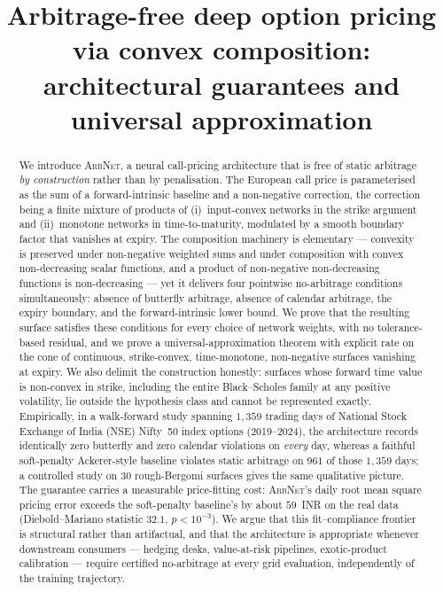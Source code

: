 \documentclass[largeformat]{interact}
\theoremstyle{plain}
\theoremstyle{definition}
\newcommand{\arbnet}{\textsc{ArbNet}}
\newcommand{\bs}{Black--Scholes}
\begin{document}

\title{Arbitrage-free deep option pricing via convex composition:
architectural guarantees and universal approximation}

\author{
}

\maketitle

\begin{abstract}
We introduce \arbnet{}, a neural call-pricing architecture that is free of
static arbitrage \emph{by construction} rather than by penalisation. The
European call price is parameterised as the sum of a forward-intrinsic baseline
and a non-negative correction, the correction being a finite mixture of
products of (i)~input-convex networks in the strike argument and (ii)~monotone
networks in time-to-maturity, modulated by a smooth boundary factor that
vanishes at expiry. The composition machinery is elementary --- convexity is
preserved under non-negative weighted sums and under composition with convex
non-decreasing scalar functions, and a product of non-negative non-decreasing
functions is non-decreasing --- yet it delivers four pointwise no-arbitrage
conditions simultaneously: absence of butterfly arbitrage, absence of calendar
arbitrage, the expiry boundary, and the forward-intrinsic lower bound. We prove
that the resulting surface satisfies these conditions for every choice of
network weights, with no tolerance-based residual, and we prove a
universal-approximation theorem with explicit rate on the cone of continuous,
strike-convex, time-monotone, non-negative surfaces vanishing at expiry. We
also delimit the construction honestly: surfaces whose forward time value is
non-convex in strike, including the entire \bs{} family at any positive
volatility, lie outside the hypothesis class and cannot be represented exactly.
Empirically, in a walk-forward study spanning $1{,}359$ trading days of
National Stock Exchange of India (NSE) Nifty~50 index options (2019--2024), the
architecture records identically zero butterfly and zero calendar violations on
\emph{every} day, whereas a faithful soft-penalty Ackerer-style baseline
violates static arbitrage on $961$ of those $1{,}359$ days; a controlled study
on $30$ rough-Bergomi surfaces gives the same qualitative picture. The
guarantee carries a measurable price-fitting cost: \arbnet{}'s daily root
mean square pricing error exceeds the soft-penalty baseline's by about
$59$~INR on the real data (Diebold--Mariano statistic $32.1$, $p < 10^{-3}$).
We argue that this fit--compliance frontier is structural rather than
artifactual, and that the architecture is appropriate whenever downstream
consumers --- hedging desks, value-at-risk pipelines, exotic-product
calibration --- require certified no-arbitrage at every grid evaluation,
independently of the training trajectory.
\end{abstract}
\end{document}
